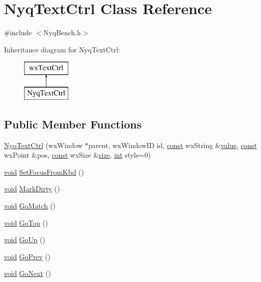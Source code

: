 \hypertarget{class_nyq_text_ctrl}{}\section{Nyq\+Text\+Ctrl Class Reference}
\label{class_nyq_text_ctrl}


{\ttfamily \#include $<$Nyq\+Bench.\+h$>$}

Inheritance diagram for Nyq\+Text\+Ctrl\+:\begin{figure}[H]
\begin{center}
\leavevmode
\includegraphics[height=2.000000cm]{class_nyq_text_ctrl}
\end{center}
\end{figure}
\subsection*{Public Member Functions}
\begin{DoxyCompactItemize}
\item 
\hyperlink{class_nyq_text_ctrl_a0ee6f4008b020e4a867091572055c0b3}{Nyq\+Text\+Ctrl} (wx\+Window $\ast$parent, wx\+Window\+ID id, \hyperlink{getopt1_8c_a2c212835823e3c54a8ab6d95c652660e}{const} wx\+String \&\hyperlink{lib_2expat_8h_a4a30a13b813682e68c5b689b45c65971}{value}, \hyperlink{getopt1_8c_a2c212835823e3c54a8ab6d95c652660e}{const} wx\+Point \&pos, \hyperlink{getopt1_8c_a2c212835823e3c54a8ab6d95c652660e}{const} wx\+Size \&\hyperlink{group__lavu__mem_ga854352f53b148adc24983a58a1866d66}{size}, \hyperlink{xmltok_8h_a5a0d4a5641ce434f1d23533f2b2e6653}{int} style=0)
\item 
\hyperlink{sound_8c_ae35f5844602719cf66324f4de2a658b3}{void} \hyperlink{class_nyq_text_ctrl_a5a457348eaa81f7933295ea50ac5c96c}{Set\+Focus\+From\+Kbd} ()
\item 
\hyperlink{sound_8c_ae35f5844602719cf66324f4de2a658b3}{void} \hyperlink{class_nyq_text_ctrl_aaa8cd3547c24d2917e0c3b23ff113ea4}{Mark\+Dirty} ()
\item 
\hyperlink{sound_8c_ae35f5844602719cf66324f4de2a658b3}{void} \hyperlink{class_nyq_text_ctrl_ab6eec92708ddb4b70d8bb7d5a30f26cf}{Go\+Match} ()
\item 
\hyperlink{sound_8c_ae35f5844602719cf66324f4de2a658b3}{void} \hyperlink{class_nyq_text_ctrl_a49fe51f368cc21389d94528aac81770c}{Go\+Top} ()
\item 
\hyperlink{sound_8c_ae35f5844602719cf66324f4de2a658b3}{void} \hyperlink{class_nyq_text_ctrl_aa204c3508bda22bb18174355bb60e166}{Go\+Up} ()
\item 
\hyperlink{sound_8c_ae35f5844602719cf66324f4de2a658b3}{void} \hyperlink{class_nyq_text_ctrl_aa87abb9a4a1c8bb835d0eded450e88ff}{Go\+Prev} ()
\item 
\hyperlink{sound_8c_ae35f5844602719cf66324f4de2a658b3}{void} \hyperlink{class_nyq_text_ctrl_ac96efbbd8a66cb057361f69098744318}{Go\+Next} ()
\end{DoxyCompactItemize}


